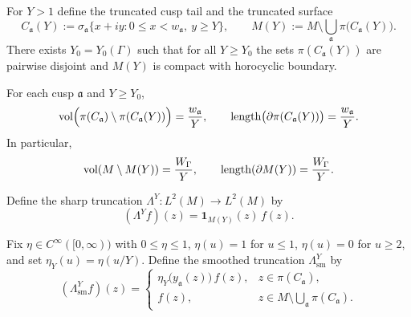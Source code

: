 For $Y>1$ define the truncated cusp tail and the truncated surface
\begin{equation}\label{eq:trunc-def}
C_{\mathfrak a}(Y):=\sigma_{\mathfrak a}\{x+iy:0\le x<w_{\mathfrak a},\ y\ge Y\},
\qquad
M(Y):=M\setminus\bigcup_{\mathfrak a}\pi\bigl(C_{\mathfrak a}(Y)\bigr).
\end{equation}
There exists $Y_0=Y_0(\Gamma)$ such that for all $Y\ge Y_0$ the sets $\pi(C_{\mathfrak a}(Y))$
are pairwise disjoint and $M(Y)$ is compact with horocyclic boundary.

\begin{lemma}\label{lem:cusp-tail-identities}
For each cusp $\mathfrak a$ and $Y\ge Y_0$,
\begin{equation}\label{eq:cusp-vol-length}
\mathop{\mathrm{vol}}\nolimits\Bigl(\pi(C_{\mathfrak a})\setminus \pi(C_{\mathfrak a}(Y))\Bigr)=\frac{w_{\mathfrak a}}{Y},
\qquad
\mathop{\mathrm{length}}\nolimits\bigl(\partial \pi(C_{\mathfrak a}(Y))\bigr)=\frac{w_{\mathfrak a}}{Y}.
\end{equation}
In particular,
\begin{equation}\label{eq:global-vol-length}
\mathop{\mathrm{vol}}\nolimits(M\setminus M(Y))=\frac{W_{\Gamma}}{Y},
\qquad
\mathop{\mathrm{length}}\nolimits(\partial M(Y))=\frac{W_{\Gamma}}{Y}.
\end{equation}
\end{lemma}

Define the sharp truncation $\Lambda^{Y}:L^{2}(M)\to L^{2}(M)$ by
\begin{equation}\label{eq:sharp-trunc}
(\Lambda^{Y}f)(z)=\mathbf 1_{M(Y)}(z)\,f(z).
\end{equation}

Fix $\eta\in C^{\infty}([0,\infty))$ with $0\le\eta\le 1$, $\eta(u)=1$ for $u\le 1$,
$\eta(u)=0$ for $u\ge 2$, and set $\eta_Y(u)=\eta(u/Y)$.
Define the smoothed truncation $\Lambda^{Y}_{\mathrm{sm}}$ by
\begin{equation}\label{eq:smooth-trunc}
(\Lambda^{Y}_{\mathrm{sm}}f)(z)=
\begin{cases}
\eta_Y\!\bigl(y_{\mathfrak a}(z)\bigr)\,f(z), & z\in \pi(C_{\mathfrak a}),\\
f(z), & z\in M\setminus\bigcup_{\mathfrak a}\pi(C_{\mathfrak a}).
\end{cases}
\end{equation}

